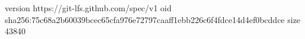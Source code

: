 version https://git-lfs.github.com/spec/v1
oid sha256:75c68a2b60039bcec65cfa976e72797caaff1ebb226c6f4fdce14d4ef0bcddce
size 43840
